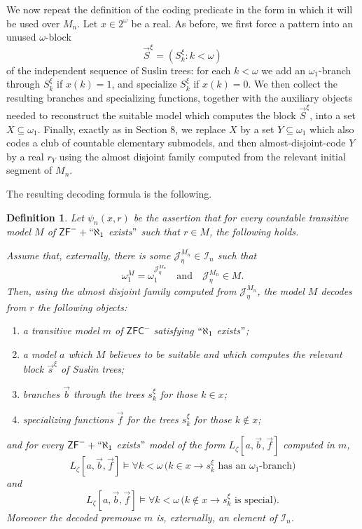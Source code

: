 \documentclass[a4paper,11pt]{article}
\newtheorem{definition}[theorem]{Definition}
\newcommand{\ZFC}{\mathsf{ZFC}}
\newcommand{\ZFP}{\mathsf{ZF}^-}
\begin{document}
We now repeat the definition of the coding predicate in the form in which it
will be used over $M_n$. Let $x\in 2^\omega$ be a real. As before, we first
force a pattern into an unused $\omega$-block
\[
\vec S^\xi=(S^\xi_k:k<\omega)
\]
of the independent sequence of Suslin trees: for each $k<\omega$ we add an
$\omega_1$-branch through $S^\xi_k$ if $x(k)=1$, and specialize $S^\xi_k$ if
$x(k)=0$. We then collect the resulting branches and specializing functions,
together with the auxiliary objects needed to reconstruct the suitable model
which computes the block $\vec S^\xi$, into a set $X\subseteq\omega_1$.
Finally, exactly as in Section 8, we replace $X$ by a set
$Y\subseteq\omega_1$ which also codes a club of countable elementary
submodels, and then almost-disjoint-code $Y$ by a real $r_Y$ using the almost
disjoint family computed from the relevant initial segment of $M_n$.

The resulting decoding formula is the following.

\begin{definition}\label{definition-psi-n}
Let $\psi_n(x,r)$ be the assertion that for every countable transitive model
$M$ of $\ZFP+``\aleph_1$ exists$"$ such that $r\in M$, the following holds.

Assume that, externally, there is some
$\mathcal J^{M_n}_{\eta}\in\mathcal I_n$ such that
\[
\omega_1^M=\omega_1^{\mathcal J^{M_n}_{\eta}}
\quad\text{and}\quad
\mathcal J^{M_n}_{\eta}\in M.
\]
Then, using the almost disjoint family computed from
$\mathcal J^{M_n}_{\eta}$, the model $M$ decodes from $r$ the following
objects:
\begin{enumerate}
    \item a transitive model $m$ of $\ZFC^-$ satisfying
    $``\aleph_1$ exists$"$;
    \item a model $a$ which $M$ believes to be suitable and which computes the
    relevant block $\vec s^\xi$ of Suslin trees;
    \item branches $\vec b$ through the trees $s^\xi_k$ for those
    $k\in x$;
    \item specializing functions $\vec f$ for the trees $s^\xi_k$ for those
    $k\notin x$;
\end{enumerate}
and for every $\ZFP+``\aleph_1$ exists$"$ model of the form
$L_\zeta[a,\vec b,\vec f]$ computed in $m$,
\[
L_\zeta[a,\vec b,\vec f]\models
\forall k<\omega\,
\bigl(k\in x\rightarrow s^\xi_k
\text{ has an }\omega_1\text{-branch}\bigr)
\]
and
\[
L_\zeta[a,\vec b,\vec f]\models
\forall k<\omega\,
\bigl(k\notin x\rightarrow s^\xi_k
\text{ is special}\bigr).
\]
Moreover the decoded premouse $m$ is, externally, an element of
$\mathcal I_n$.
\end{definition}
\end{document}
